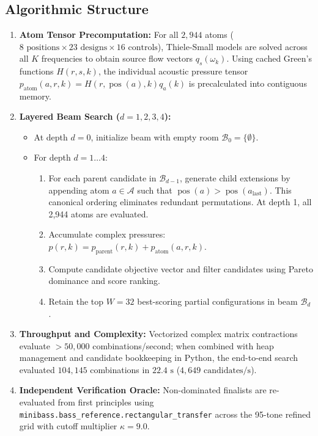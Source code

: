 \documentclass[11pt,a4paper]{article}
\begin{document}
\subsection{Algorithmic Structure}
\begin{enumerate}
    \item \textbf{Atom Tensor Precomputation:} For all $2,944$ atoms ($8\text{ positions} \times 23\text{ designs} \times 16\text{ controls}$), Thiele-Small models are solved across all $K$ frequencies to obtain source flow vectors $q_s(\omega_k)$. Using cached Green's functions $H(r, s, k)$, the individual acoustic pressure tensor $p_{\text{atom}}(a, r, k) = H(r, \operatorname{pos}(a), k) q_a(k)$ is precalculated into contiguous memory.
    \item \textbf{Layered Beam Search ($d = 1, 2, 3, 4$):}
    \begin{itemize}
        \item At depth $d=0$, initialize beam with empty room $\mathcal{B}_0 = \{\emptyset\}$.
        \item For depth $d = 1 \dots 4$:
        \begin{enumerate}
            \item For each parent candidate in $\mathcal{B}_{d-1}$, generate child extensions by appending atom $a \in \mathcal{A}$ such that $\operatorname{pos}(a) > \operatorname{pos}(a_{\text{last}})$. This canonical ordering eliminates redundant permutations. At depth 1, all 2,944 atoms are evaluated.
            \item Accumulate complex pressures: $p(r, k) = p_{\text{parent}}(r, k) + p_{\text{atom}}(a, r, k)$.
            \item Compute candidate objective vector and filter candidates using Pareto dominance and score ranking.
            \item Retain the top $W = 32$ best-scoring partial configurations in beam $\mathcal{B}_d$.
        \end{enumerate}
    \end{itemize}
    \item \textbf{Throughput and Complexity:} Vectorized complex matrix contractions evaluate $>50,000$ combinations/second; when combined with heap management and candidate bookkeeping in Python, the end-to-end search evaluated $104,145$ combinations in $22.4\text{ s}$ ($4,649\text{ candidates/s}$).
    \item \textbf{Independent Verification Oracle:} Non-dominated finalists are re-evaluated from first principles using \texttt{minibass.bass\_reference.rectangular\_transfer} across the 95-tone refined grid with cutoff multiplier $\kappa = 9.0$.
\end{enumerate}
\end{document}
